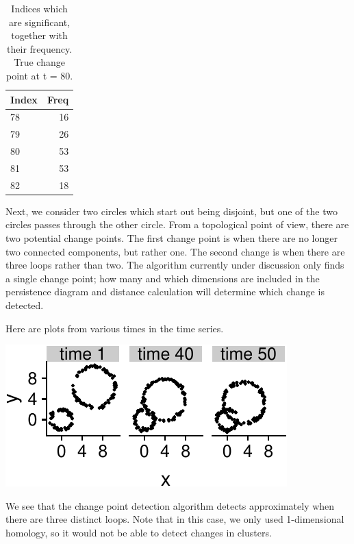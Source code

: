 \documentclass[smallextended]{svjour3}       %
\begin{document}
\begin{longtable}[t]{lr}
\caption{\label{tab:unnamed-chunk-2}Indices which are significant, together with their frequency. True change point at t = 80.}\\
\toprule
Index & Freq\\
\midrule
78 & 16\\
79 & 26\\
80 & 53\\
81 & 53\\
82 & 18\\
\bottomrule
\end{longtable}

Next, we consider two circles which start out being disjoint, but one of
the two circles passes through the other circle. From a topological
point of view, there are two potential change points. The first change
point is when there are no longer two connected components, but rather
one. The second change is when there are three loops rather than two.
The algorithm currently under discussion only finds a single change
point; how many and which dimensions are included in the persistence
diagram and distance calculation will determine which change is
detected.

Here are plots from various times in the time series.

\begin{center}\includegraphics{springer_template_files/figure-latex/chunk_7-1} \end{center}

We see that the change point detection algorithm detects approximately
when there are three distinct loops. Note that in this case, we only
used 1-dimensional homology, so it would not be able to detect changes
in clusters.
\end{document}
